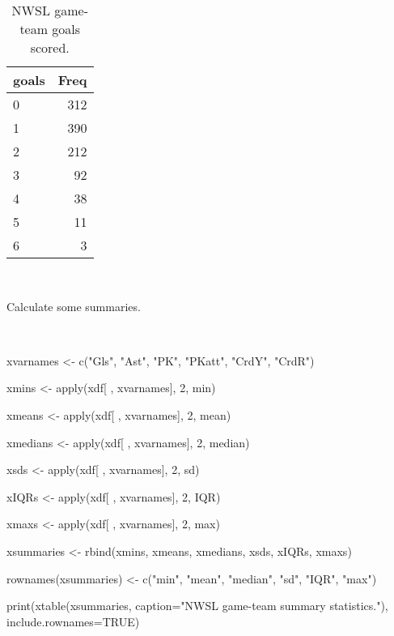 \documentclass[
]{article}
\newenvironment{Shaded}{\begin{snugshade}}{\end{snugshade}}
\newcommand{\AttributeTok}[1]{\textcolor[rgb]{0.77,0.63,0.00}{#1}}
\newcommand{\ConstantTok}[1]{\textcolor[rgb]{0.00,0.00,0.00}{#1}}
\newcommand{\DecValTok}[1]{\textcolor[rgb]{0.00,0.00,0.81}{#1}}
\newcommand{\FunctionTok}[1]{\textcolor[rgb]{0.00,0.00,0.00}{#1}}
\newcommand{\NormalTok}[1]{#1}
\newcommand{\OtherTok}[1]{\textcolor[rgb]{0.56,0.35,0.01}{#1}}
\newcommand{\StringTok}[1]{\textcolor[rgb]{0.31,0.60,0.02}{#1}}
\begin{document}
\begin{table}[ht]
\centering
\begin{tabular}{lr}
  \hline
goals & Freq \\ 
  \hline
0 & 312 \\ 
  1 & 390 \\ 
  2 & 212 \\ 
  3 &  92 \\ 
  4 &  38 \\ 
  5 &  11 \\ 
  6 &   3 \\ 
   \hline
\end{tabular}
\caption{NWSL game-team goals scored.} 
\end{table}

~~

Calculate some summaries.

~~

\begin{Shaded}
\begin{Highlighting}[]
\NormalTok{xvarnames }\OtherTok{\textless{}{-}} \FunctionTok{c}\NormalTok{(}\StringTok{"Gls"}\NormalTok{, }\StringTok{"Ast"}\NormalTok{, }\StringTok{"PK"}\NormalTok{, }\StringTok{"PKatt"}\NormalTok{, }\StringTok{"CrdY"}\NormalTok{, }\StringTok{"CrdR"}\NormalTok{)}

\NormalTok{xmins }\OtherTok{\textless{}{-}} \FunctionTok{apply}\NormalTok{(xdf[ , xvarnames], }\DecValTok{2}\NormalTok{, min)}

\NormalTok{xmeans }\OtherTok{\textless{}{-}} \FunctionTok{apply}\NormalTok{(xdf[ , xvarnames], }\DecValTok{2}\NormalTok{, mean)}

\NormalTok{xmedians }\OtherTok{\textless{}{-}} \FunctionTok{apply}\NormalTok{(xdf[ , xvarnames], }\DecValTok{2}\NormalTok{, median)}

\NormalTok{xsds }\OtherTok{\textless{}{-}} \FunctionTok{apply}\NormalTok{(xdf[ , xvarnames], }\DecValTok{2}\NormalTok{, sd)}

\NormalTok{xIQRs }\OtherTok{\textless{}{-}} \FunctionTok{apply}\NormalTok{(xdf[ , xvarnames], }\DecValTok{2}\NormalTok{, IQR)}

\NormalTok{xmaxs }\OtherTok{\textless{}{-}} \FunctionTok{apply}\NormalTok{(xdf[ , xvarnames], }\DecValTok{2}\NormalTok{, max)}

\NormalTok{xsummaries }\OtherTok{\textless{}{-}} \FunctionTok{rbind}\NormalTok{(xmins, xmeans, xmedians, xsds, xIQRs, xmaxs)}

\FunctionTok{rownames}\NormalTok{(xsummaries) }\OtherTok{\textless{}{-}} \FunctionTok{c}\NormalTok{(}\StringTok{"min"}\NormalTok{, }\StringTok{"mean"}\NormalTok{, }\StringTok{"median"}\NormalTok{, }\StringTok{"sd"}\NormalTok{, }\StringTok{"IQR"}\NormalTok{, }\StringTok{"max"}\NormalTok{)}

\FunctionTok{print}\NormalTok{(}\FunctionTok{xtable}\NormalTok{(xsummaries, }\AttributeTok{caption=}\StringTok{"NWSL game{-}team summary statistics."}\NormalTok{), }\AttributeTok{include.rownames=}\ConstantTok{TRUE}\NormalTok{)}
\end{Highlighting}
\end{Shaded}
\end{document}
